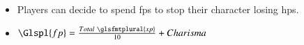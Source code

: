 \begin{itemize}
  \item
  Players can decide to spend \glspl{fp} to stop their character losing \glspl{hp}.
  \item
  $\Glspl{fp} = \frac{Total~\glsfmtplural{xp}}{10} + Charisma$
\end{itemize}
